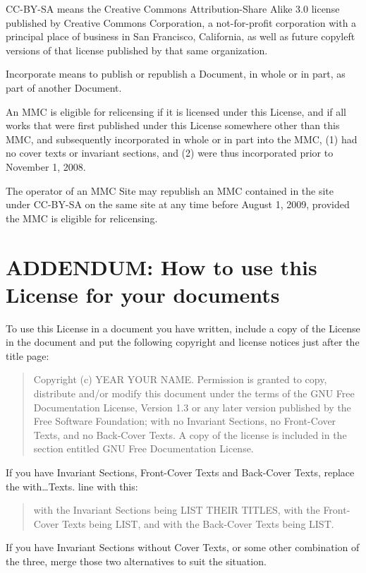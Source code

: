 \documentclass[captions=tableheading]{scrbook}
\begin{document}
CC-BY-SA means the Creative Commons Attribution-Share Alike 3.0 license published by Creative Commons Corporation, a not-for-profit corporation with a principal place of business in San Francisco, California, as well as future copyleft versions of that license published by that same organization.

Incorporate means to publish or republish a Document, in whole or in part, as part of another Document.

An MMC is eligible for relicensing if it is licensed under this License, and if all works that were first published under this License somewhere other than this MMC, and subsequently incorporated in whole or in part into the MMC, (1) had no cover texts or invariant sections, and (2) were thus incorporated prior to November 1, 2008.

The operator of an MMC Site may republish an MMC contained in the site under CC-BY-SA on the same site at any time before August 1, 2009, provided the MMC is eligible for relicensing.
\section{ADDENDUM: How to use this License for your documents}
\label{sec-18-13}


To use this License in a document you have written, include a copy of the License in the document and put the following copyright and license notices just after the title page: 

\begin{quote}
\noindent Copyright (c) YEAR YOUR NAME. Permission is granted to copy, distribute and/or modify this document under the terms of the GNU Free Documentation License, Version 1.3 or any later version published by the Free Software Foundation; with no Invariant Sections, no Front-Cover Texts, and no Back-Cover Texts. A copy of the license is included in the section entitled GNU Free Documentation License.
\end{quote}

If you have Invariant Sections, Front-Cover Texts and Back-Cover Texts, replace the with\ldots{}Texts. line with this:

\begin{quote}
\noindent with the Invariant Sections being LIST THEIR TITLES, with the Front-Cover Texts being LIST, and with the Back-Cover Texts being LIST.
\end{quote}

If you have Invariant Sections without Cover Texts, or some other combination of the three, merge those two alternatives to suit the situation.
\end{document}
